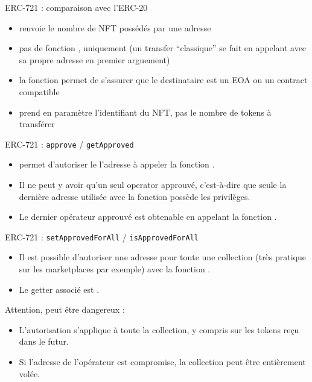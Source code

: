 \begin{frame}[fragile]{ERC-721 : comparaison avec l'ERC-20}
  \begin{itemize}
    \item {} renvoie le nombre de NFT possédés par une adresse
    \item pas de fonction , uniquement  (un transfer \enquote{classique} se fait en appelant  avec sa propre adresse en premier arguement)
    \item la fonction  permet de s'assurer que le destinataire est un EOA ou un contract compatible
    \item {} prend en paramètre l'identifiant du NFT, pas le nombre de tokens à transférer
  \end{itemize}
\end{frame}

\begin{frame}[fragile]{ERC-721 : \texttt{approve} / \texttt{getApproved}}
  \begin{itemize}
    \item {} permet d'autoriser le l'adresse  à appeler la fonction .
    \item Il ne peut y avoir qu'un seul operator approuvé, c'est-à-dire que seule la dernière adresse utilisée avec la fonction  possède les privilèges.
    \item Le dernier opérateur approuvé est obtenable en appelant la fonction .
  \end{itemize}
\end{frame}

\begin{frame}[fragile]{ERC-721 : \texttt{setApprovedForAll} / \texttt{isApprovedForAll}}
  \begin{itemize}
    \item Il est possible d'autoriser une adresse pour toute une collection (très pratique sur les marketplaces par exemple) avec la fonction .
    \item Le getter associé est .
  \end{itemize}

  Attention,  peut être dangereux :

  \begin{itemize}
    \item L'autorisation s'applique à toute la collection, y compris sur les tokens reçu dans le futur.
    \item Si l'adresse de l'opérateur est compromise, la collection peut être entièrement volée.
  \end{itemize}
\end{frame}

